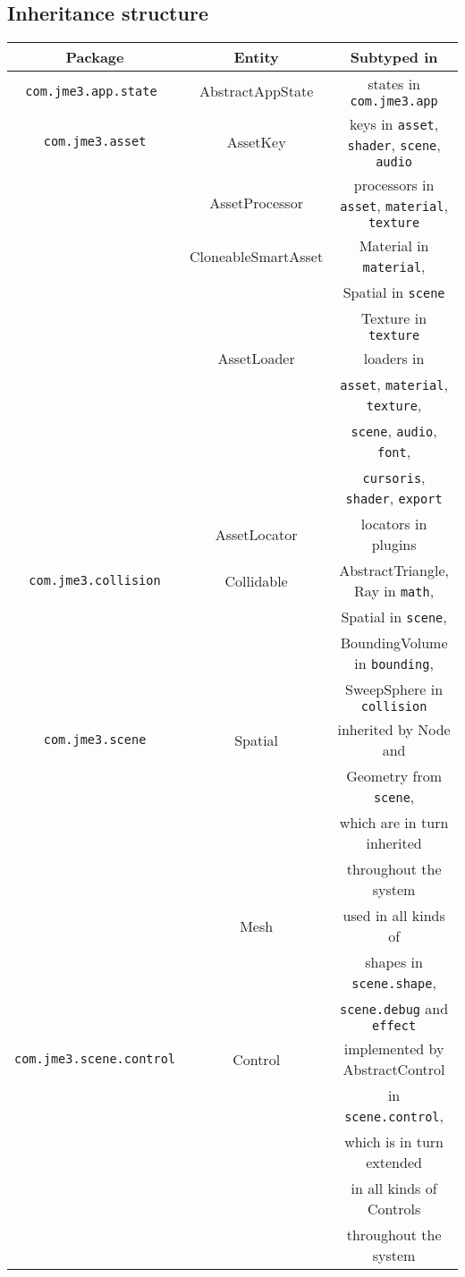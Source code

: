 \documentclass[a4paper, 10pt]{article}
\begin{document}
\subsection{Inheritance structure}
\label{sec:inheritance_structure}
\begin{table}
\centering
\begin{tabular}{|c|c|c|}
\hline
\textbf{Package}&\textbf{Entity}&\textbf{Subtyped in}\\
\hline
\verb|com.jme3.app.state |&
	AbstractAppState&
		states in \verb|com.jme3.app|\\

\hline
\verb|com.jme3.asset|&
	AssetKey&
	keys in \verb|asset|, \verb|shader|, \verb|scene|, \verb|audio|\\
\hline&
	AssetProcessor&
	processors in \verb|asset|, \verb|material|, \verb|texture|\\
\hline&
	CloneableSmartAsset&
	Material in \verb|material|,\\&& 
	Spatial in \verb|scene|\\&&
	Texture in \verb|texture|\\
\hline&
	AssetLoader&
	loaders in\\&&
	\verb|asset|, \verb|material|, \verb|texture|,\\&&
	\verb|scene|, \verb|audio|, \verb|font|, \\&&
	\verb|cursoris|, \verb|shader|, \verb|export|\\
\hline&
	AssetLocator&
	locators in plugins\\
\hline
\verb|com.jme3.collision|&
	Collidable&
	AbstractTriangle, Ray in \verb|math|,\\&&
	Spatial in \verb|scene|,\\&&
	BoundingVolume in \verb|bounding|,\\&&
	SweepSphere in \verb|collision|\\

\hline
\verb|com.jme3.scene|&
	Spatial&
	inherited by Node and\\&&
	Geometry from \verb|scene|,\\&&
	which are in turn inherited\\&&
	throughout the system\\
\hline&
	Mesh&
	used in all kinds of \\&&
	shapes in \verb|scene.shape|,\\&&
	\verb|scene.debug| and \verb|effect|\\
\hline
\verb|com.jme3.scene.control|&
	Control&
	implemented by AbstractControl \\&&
	in \verb|scene.control|,\\&&
	which is in turn extended \\&&
	in all kinds of Controls\\&&
	throughout the system\\
\hline
\end{tabular}
\end{table}
\end{document}
